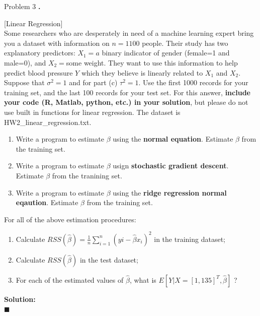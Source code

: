 \documentclass{article}
\newcounter{pcounter}                                   %
\newenvironment{problem}                                %
{                                                       %
    \color{gray}                                        %
    \stepcounter{pcounter}                              %
    \textbf{\arabic{pcounter}.}                         %
}{}                                                     %
\newenvironment{solution}                               %
{\textbf{Solution:} \\}{$\blacksquare$\newline}         %
\begin{document}
    \begin{section}{Problem 3}
        \setcounter{pcounter}{0}
        \begin{problem}
            [Linear Regression]\\
            Some researchers who are desperately in need of a machine learning expert bring you a dataset with information on $n = 1100$ people.
            Their study has two explanatory predictors: $X_1=a$ binary indicator of gender (female=1 and male=0), and $X_2=$some weight.
            They want to use this information to help predict blood pressure $Y$ which they believe is linearly related to $X_1$ and $X_2$.\\
            Suppose that $\sigma^2 = 1$ and for part (c) $\tau^2=1$. Use the first 1000 records for your training set, and the last 100 records for your test set.
            For this answer, \textbf{include your code (R, Matlab, python, etc.) in your solution}, but please do not use built in functions for linear regression. The dataset is HW2\_linear\_regression.txt.
            \begin{enumerate}[label=(\alph*)]
                \item Write a program to estimate $\beta$ using the \textbf{normal equation}. Estimate $\beta$ from the training set.
                \item Write a program to estimate $\beta$ usign \textbf{stochastic gradient descent}. Estimate $\beta$ from the tranining set.
                \item Write a program to estimate $\beta$ using the \textbf{ridge regression normal eqaution}. Estimate $\beta$ from the training set.
            \end{enumerate}
            For all of the above estimation procedures:
            \begin{enumerate}[resume, label=(\alph*)]
                \item Calculate $RSS(\hat{\beta}) = \frac{1}{n} \sum_{i=1}^{n} (yi - \hat{\beta} x_i)^2$ in the training dataset;
                \item Calculate $RSS(\hat{\beta})$ in the test dataset;
                \item For each of the estimated values of $\hat{\beta}$, what is $E[Y|X=[1,135]^T, \hat{\beta}]$ ?
            \end{enumerate}
        \end{problem}

        \begin{solution}
            

\end{solution}
\end{section}
\end{document}
